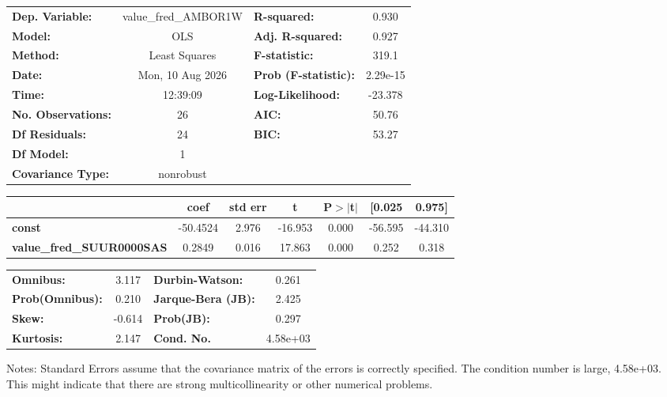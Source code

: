 \begin{center}
\begin{tabular}{lclc}
\toprule
\textbf{Dep. Variable:}           & value\_fred\_AMBOR1W & \textbf{  R-squared:         } &     0.930   \\
\textbf{Model:}                   &         OLS          & \textbf{  Adj. R-squared:    } &     0.927   \\
\textbf{Method:}                  &    Least Squares     & \textbf{  F-statistic:       } &     319.1   \\
\textbf{Date:}                    &   Mon, 10 Aug 2026   & \textbf{  Prob (F-statistic):} &  2.29e-15   \\
\textbf{Time:}                    &       12:39:09       & \textbf{  Log-Likelihood:    } &   -23.378   \\
\textbf{No. Observations:}        &            26        & \textbf{  AIC:               } &     50.76   \\
\textbf{Df Residuals:}            &            24        & \textbf{  BIC:               } &     53.27   \\
\textbf{Df Model:}                &             1        & \textbf{                     } &             \\
\textbf{Covariance Type:}         &      nonrobust       & \textbf{                     } &             \\
\bottomrule
\end{tabular}
\begin{tabular}{lcccccc}
                                  & \textbf{coef} & \textbf{std err} & \textbf{t} & \textbf{P$> |$t$|$} & \textbf{[0.025} & \textbf{0.975]}  \\
\midrule
\textbf{const}                    &     -50.4524  &        2.976     &   -16.953  &         0.000        &      -56.595    &      -44.310     \\
\textbf{value\_fred\_SUUR0000SAS} &       0.2849  &        0.016     &    17.863  &         0.000        &        0.252    &        0.318     \\
\bottomrule
\end{tabular}
\begin{tabular}{lclc}
\textbf{Omnibus:}       &  3.117 & \textbf{  Durbin-Watson:     } &    0.261  \\
\textbf{Prob(Omnibus):} &  0.210 & \textbf{  Jarque-Bera (JB):  } &    2.425  \\
\textbf{Skew:}          & -0.614 & \textbf{  Prob(JB):          } &    0.297  \\
\textbf{Kurtosis:}      &  2.147 & \textbf{  Cond. No.          } & 4.58e+03  \\
\bottomrule
\end{tabular}
\end{center}

Notes: \newline
 [1] Standard Errors assume that the covariance matrix of the errors is correctly specified. \newline
 [2] The condition number is large, 4.58e+03. This might indicate that there are \newline
 strong multicollinearity or other numerical problems.